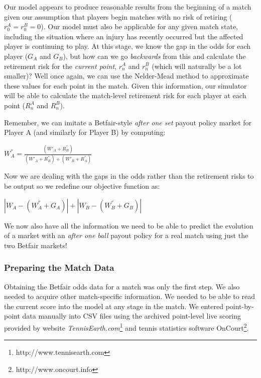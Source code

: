 \documentclass[letterpaper,12pt]{article}
\begin{document}
Our model appears to produce reasonable results from the beginning of a match given our assumption that players begin matches with no risk of retiring ($r_0^A = r_0^B = 0$).  Our model must also be applicable for any given match state, including the situation where an injury has recently occurred but the affected player is continuing to play.  At this stage, we know the gap in the odds for each player ($G_A$ and $G_B$), but how can we go \textit{backwards} from this and calculate the retirement risk for the \textit{current point}, $r_n^A$ and $r_n^B$ (which will naturally be a lot smaller)?  Well once again, we can use the Nelder-Mead method to approximate these values for each point in the match.  Given this information, our simulator will be able to calculate the match-level retirement risk for each player at each point ($R_n^A$ and $R_n^B$).

Remember, we can imitate a Betfair-style \textit{after one set} payout policy market for Player A (and similarly for Player B) by computing:

\begin{center}
	$W_A^{''} = \frac{(W'_A + R_B^{''})}{(W'_A + R_B^{''}) + (W'_B + R_A^{''})}$
\end{center}

Now we are dealing with the gaps in the odds rather than the retirement risks to be output so we redefine our objective function as:

\begin{center}
	$\left|W_A - (W_A^{''} + G_A)\right| + \left|W_B - (W_B^{''} + G_B)\right|$
\end{center}

We now also have all the information we need to be able to predict the evolution of a market with an \textit{after one ball} payout policy for a real match using just the two Betfair markets!

\subsubsection{Preparing the Match Data}

Obtaining the Betfair odds data for a match was only the first step.  We also needed to acquire other match-specific information.  We needed to be able to read the current score into the model at any stage in the match.  We entered point-by-point data manually into CSV files using the archived point-level live scoring provided by website \textit{TennisEarth.com}\footnote{http://www.tennisearth.com} and tennis statistics software OnCourt\footnote{http://www.oncourt.info}.  
\end{document}
